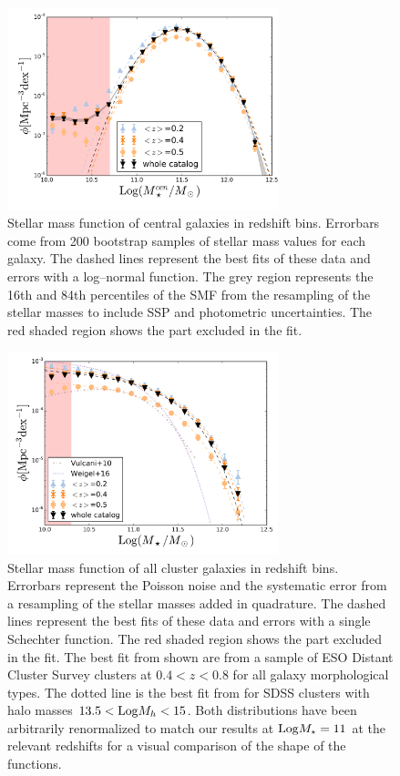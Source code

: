 {\begin{figure}\centering
\includegraphics[width=0.7\textwidth]{./chapters/chapter6/figs/SMF_cen_chab_gaussian_Mar18.png}
\caption{Stellar mass function of central galaxies in redshift bins. Errorbars come from 200 bootstrap samples of stellar mass values for each galaxy. The dashed lines represent the best fits of these data and errors with a log--normal function. The grey region represents the 16th and 84th percentiles of the SMF from the resampling of the stellar masses to include SSP and photometric uncertainties. The red shaded region shows the part excluded in the fit.}\label{fig:smf}\end{figure}
\begin{figure}\centering
\includegraphics[width=0.7\textwidth]{./chapters/chapter6/figs/SMF_tot_chab.png}
\caption{Stellar mass function of all cluster galaxies in redshift bins. Errorbars represent the Poisson noise and the systematic error from a resampling of the stellar masses added in quadrature. The dashed lines represent the best fits of these data and errors with a single Schechter function. The red shaded region shows the part excluded in the fit. The best fit from \citet{vulcani} shown are from a sample of ESO Distant Cluster Survey clusters at $0.4<z<0.8$ for all galaxy morphological types. The dotted line is the best fit from \citet{weigel} for SDSS clusters with halo masses $13.5<{\rm Log} M_h<15$. Both distributions have been arbitrarily renormalized to match our results at ${\rm Log} M_\star =11$ at the relevant redshifts for a visual comparison of the shape of the functions.}\label{fig:smf_tot}\end{figure}

}
